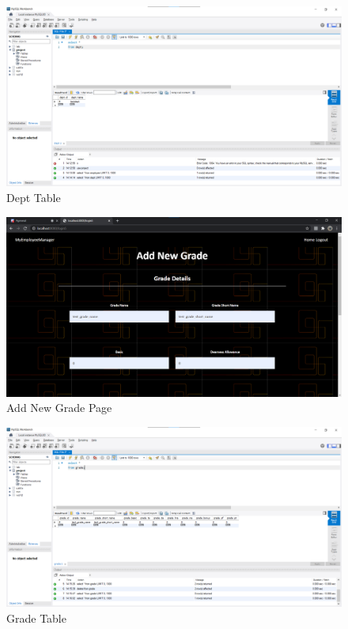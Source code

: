 \documentclass[12pt]{article}
\begin{document}
\begin{figure}
    \centering
    \includegraphics[width = \columnwidth]{screenshots/addnewdeptsql.png}
    \caption{Dept Table}
    \label{fig:my_label}
\end{figure}

\begin{figure}
    \centering
    \includegraphics[width = \columnwidth]{screenshots/addnewgradepage.png}
    \caption{Add New Grade Page}
    \label{fig:my_label}
\end{figure}

\begin{figure}
    \centering
    \includegraphics[width = \columnwidth]{screenshots/addnewgradesql.png}
    \caption{Grade Table}
    \label{fig:my_label}
\end{figure}
\end{document}
